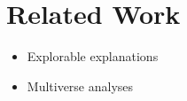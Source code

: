 \section{Related Work}
\label{sec:related}

\begin{itemize}
\item Explorable explanations \cite{victor11b}
\item Multiverse analyses \cite{steegen16,dragicevic19}
\end{itemize}
